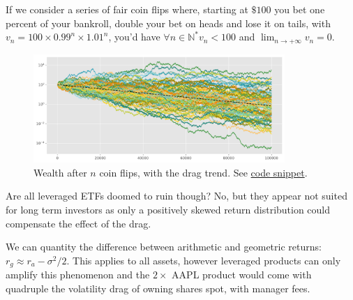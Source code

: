 If we consider a series of fair coin flips where, starting at $\$100$ you bet one percent of your bankroll, double your bet on heads and lose it on tails, with $v_n=100\times 0.99^{n} \times 1.01^n$, you'd have $\forall n \in \mathbb{N}^{*} v_n < 100$ and $\lim_{n \to +\infty} v_n = 0$.

\begin{figure}[H]
    \includegraphics[width=0.85\textwidth]{include/img/coin_flip_drag.png}
    \centering
    \caption{Wealth after $n$ coin flips, with the drag trend. See \href{https://github.com/vtisserand/quant_itws/tree/main/code/snippet/coin_flip_drag.py}{code snippet}.}
    \label{fig:coin_flip_drag}
\end{figure}

Are all leveraged ETFs doomed to ruin though? No, but they appear not suited for long term investors as only a positively skewed return distribution could compensate the effect of the drag.

We can quantity the difference between arithmetic and geometric returns: $r_g \approx r_a - \sigma^2/2$. This applies to all assets, however leveraged products can only amplify this phenomenon and the $2\times$ AAPL product would come with quadruple the volatility drag of owning shares spot, with manager fees.